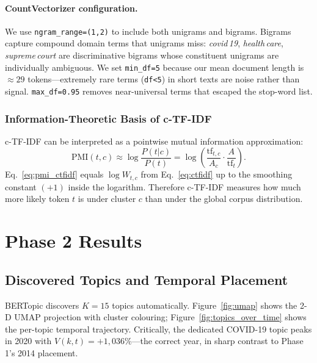 \documentclass[10pt,twocolumn,a4paper]{article}
\begin{document}
\paragraph{CountVectorizer configuration.} We use \texttt{ngram\_range=(1,2)} to include both unigrams and bigrams. Bigrams capture compound domain terms that unigrams miss: \emph{covid\,19}, \emph{health\,care}, \emph{supreme\,court} are discriminative bigrams whose constituent unigrams are individually ambiguous. We set \texttt{min\_df=5} because our mean document length is $\approx 29$ tokens---extremely rare terms (\texttt{df<5}) in short texts are noise rather than signal. \texttt{max\_df=0.95} removes near-universal terms that escaped the stop-word list.

\subsubsection{Information-Theoretic Basis of c-TF-IDF}
\label{sec:ctfidf_info}

c-TF-IDF can be interpreted as a pointwise mutual information approximation:
\begin{equation}
\label{eq:pmi_ctfidf}
\text{PMI}(t,c) \approx \log\!\frac{P(t|c)}{P(t)}
= \log\!\left(\frac{\text{tf}_{t,c}}{A_c}\cdot\frac{A}{\text{tf}_t}\right).
\end{equation}
Eq.~\eqref{eq:pmi_ctfidf} equals $\log W_{t,c}$ from Eq.~\eqref{eq:ctfidf} up to the smoothing constant $(+1)$ inside the logarithm. Therefore c-TF-IDF measures how much more likely token $t$ is under cluster $c$ than under the global corpus distribution.

\section{Phase 2 Results}
\label{sec:results}

\subsection{Discovered Topics and Temporal Placement}

BERTopic discovers $K = 15$ topics automatically. Figure~\ref{fig:umap} shows the 2-D UMAP projection with cluster colouring; Figure~\ref{fig:topics_over_time} shows the per-topic temporal trajectory. Critically, the dedicated COVID-19 topic peaks in 2020 with $V(k,t) = +1{,}036\%$---the correct year, in sharp contrast to Phase 1's 2014 placement.
\end{document}

